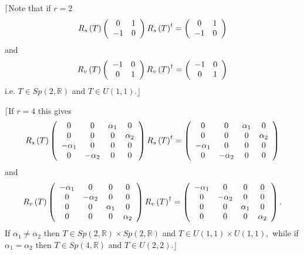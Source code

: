 \documentclass[aps,preprint]{revtex4}%
\begin{document}
$\lceil$Note that if $r=2$
\begin{equation}
R_{s}\left(  T\right)  \left(
\begin{array}
[c]{cc}%
0 & 1\\
-1 & 0
\end{array}
\right)  R_{s}\left(  T\right)  ^{t}=\left(
\begin{array}
[c]{cc}%
0 & 1\\
-1 & 0
\end{array}
\right)
\end{equation}
and
\begin{equation}
R_{v}\left(  T\right)  \left(
\begin{array}
[c]{cc}%
-1 & 0\\
0 & 1
\end{array}
\right)  R_{v}\left(  T\right)  ^{\dagger}=\left(
\begin{array}
[c]{cc}%
-1 & 0\\
0 & 1
\end{array}
\right)
\end{equation}
i.e. $T\in Sp\left(  2,\mathbb{R}\right)  $ and $T\in U\left(  1,1\right)
.\rfloor$

$\lceil$If $r=4$ this gives
\begin{equation}
R_{s}\left(  T\right)  \left(
\begin{array}
[c]{cccc}%
0 & 0 & \alpha_{1} & 0\\
0 & 0 & 0 & \alpha_{2}\\
-\alpha_{1} & 0 & 0 & 0\\
0 & -\alpha_{2} & 0 & 0
\end{array}
\right)  R_{s}\left(  T\right)  ^{t}=\left(
\begin{array}
[c]{cccc}%
0 & 0 & \alpha_{1} & 0\\
0 & 0 & 0 & \alpha_{2}\\
-\alpha_{1} & 0 & 0 & 0\\
0 & -\alpha_{2} & 0 & 0
\end{array}
\right)
\end{equation}
and
\begin{equation}
R_{v}\left(  T\right)  \left(
\begin{array}
[c]{cccc}%
-\alpha_{1} & 0 & 0 & 0\\
0 & -\alpha_{2} & 0 & 0\\
0 & 0 & \alpha_{1} & 0\\
0 & 0 & 0 & \alpha_{2}%
\end{array}
\right)  R_{v}\left(  T\right)  ^{\dagger}=\left(
\begin{array}
[c]{cccc}%
-\alpha_{1} & 0 & 0 & 0\\
0 & -\alpha_{2} & 0 & 0\\
0 & 0 & \alpha_{1} & 0\\
0 & 0 & 0 & \alpha_{2}%
\end{array}
\right)  .
\end{equation}
If $\alpha_{1}\neq\alpha_{2}$ then $T\in Sp\left(  2,\mathbb{R}\right)  \times
Sp\left(  2,\mathbb{R}\right)  $ and $T\in U\left(  1,1\right)  \times
U\left(  1,1\right)  ,$ while if $\alpha_{1}=\alpha_{2}$ then $T\in Sp\left(
4,\mathbb{R}\right)  $ and $T\in U\left(  2,2\right)  .\rfloor$
\end{document}

